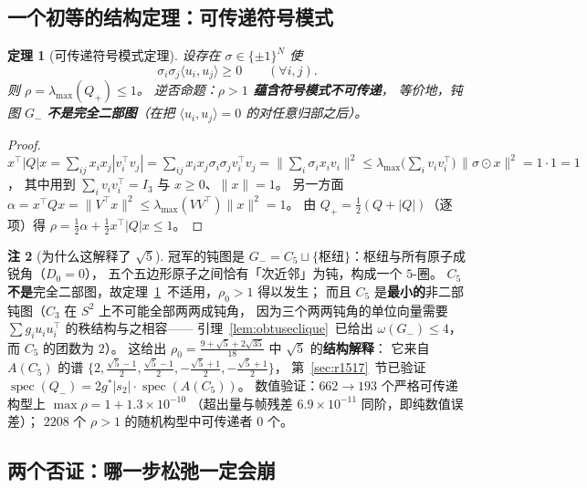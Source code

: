 \documentclass[UTF8,11pt]{ctexart}
\newtheorem{theorem}{定理}[section]
\theoremstyle{definition}
\newtheorem{remark}[theorem]{注}
\begin{document}
\subsection{一个初等的结构定理：可传递符号模式}\label{sec:r18:trans}

\begin{theorem}[可传递符号模式定理]\label{thm:transitive}
设存在 $\sigma\in\{\pm1\}^N$ 使
\begin{equation}\label{eq:transig}
\sigma_i\sigma_j\langle u_i,u_j\rangle\ge0\qquad(\forall i,j).
\end{equation}
则 $\rho=\lambda_{\max}(Q_+)\le1$。
逆否命题：\textbf{$\rho>1$ 蕴含符号模式不可传递}，
等价地，钝图 $G_-$ \textbf{不是完全二部图}（在把 $\langle u_i,u_j\rangle=0$ 的对任意归部之后）。
\end{theorem}

\begin{proof}
$x^\top|Q|x=\sum_{ij}x_ix_j|v_i^\top v_j|
=\sum_{ij}x_ix_j\sigma_i\sigma_jv_i^\top v_j
=\bigl\|\sum_i\sigma_ix_iv_i\bigr\|^2
\le\lambda_{\max}\bigl(\sum_iv_iv_i^\top\bigr)\,\|\sigma\odot x\|^2=1\cdot1=1$，
其中用到 $\sum_iv_iv_i^\top=I_3$ 与 $x\ge0$、$\|x\|=1$。
另一方面 $\alpha=x^\top Qx=\|V^\top x\|^2\le\lambda_{\max}(VV^\top)\|x\|^2=1$。
由 $Q_+=\tfrac12(Q+|Q|)$（逐项）得 $\rho=\tfrac12\alpha+\tfrac12x^\top|Q|x\le1$。
\end{proof}

\begin{remark}[为什么这解释了 $\sqrt5$]\label{rmk:transread}
冠军的钝图是 $G_-=C_5\sqcup\{\text{枢纽}\}$：枢纽与所有原子成锐角（$D_0=0$），
五个五边形原子之间恰有「次近邻」为钝，构成一个 $5$-圈。
$C_5$ \textbf{不是}完全二部图，故定理~\ref{thm:transitive}~不适用，$\rho_0>1$ 得以发生；
而且 $C_5$ 是\textbf{最小的}非二部钝图（$C_3$ 在 $S^2$ 上不可能全部两两成钝角，
因为三个两两钝角的单位向量需要 $\sum g_iu_iu_i^\top$ 的秩结构与之相容——
引理~\ref{lem:obtuseclique}~已给出 $\omega(G_-)\le4$，而 $C_5$ 的团数为 $2$）。
这给出 $\rho_0=\frac{9+\sqrt5+2\sqrt{35}}{18}$ 中 $\sqrt5$ 的\textbf{结构解释}：
它来自 $A(C_5)$ 的谱 $\{2,\frac{\sqrt5-1}2,\frac{\sqrt5-1}2,-\frac{\sqrt5+1}2,-\frac{\sqrt5+1}2\}$，
第~\ref{sec:r1517}~节已验证 $\operatorname{spec}(Q_-)=2g^*|s_2|\cdot\operatorname{spec}(A(C_5))$。
数值验证：$662\to193$ 个严格可传递构型上 $\max\rho=1+1.3\times10^{-10}$
（超出量与帧残差 $6.9\times10^{-11}$ 同阶，即纯数值误差）；
$2208$ 个 $\rho>1$ 的随机构型中可传递者 $0$ 个。
\end{remark}

\subsection{两个否证：哪一步松弛一定会崩}\label{sec:r18:ref}
\end{document}
